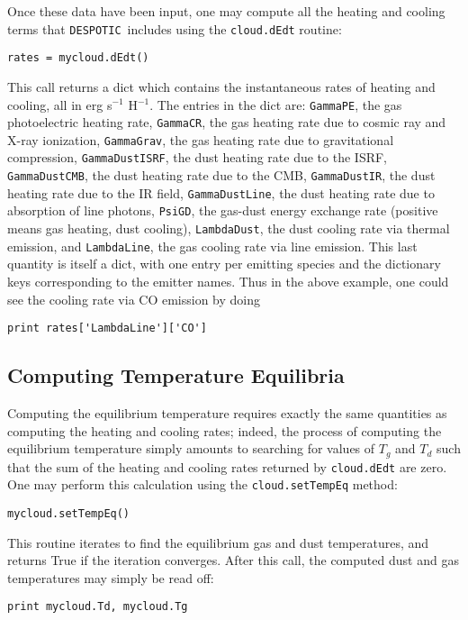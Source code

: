 \documentclass[12pt]{article}
\newcommand{\despotic}{\texttt{DESPOTIC}}
\begin{document}
Once these data have been input, one may compute all the heating and cooling terms that \despotic\ includes using the \verb=cloud.dEdt= routine:
\begin{verbatim}
rates = mycloud.dEdt()
\end{verbatim}
This call returns a dict which contains the instantaneous rates of heating and cooling, all in erg s$^{-1}$ H$^{-1}$. The entries in the dict are: \verb=GammaPE=, the gas photoelectric heating rate, \verb=GammaCR=, the gas heating rate due to cosmic ray and X-ray ionization, \verb=GammaGrav=, the gas heating rate due to gravitational compression, \verb=GammaDustISRF=, the dust heating rate due to the ISRF, \verb=GammaDustCMB=, the dust heating rate due to the CMB, \verb=GammaDustIR=, the dust heating rate due to the IR field, \verb=GammaDustLine=, the dust heating rate due to absorption of line photons, \verb=PsiGD=, the gas-dust energy exchange rate (positive means gas heating, dust cooling), \verb=LambdaDust=, the dust cooling rate via thermal emission, and \verb=LambdaLine=, the gas cooling rate via line emission. This last quantity is itself a dict, with one entry per emitting species and the dictionary keys corresponding to the emitter names. Thus in the above example, one could see the cooling rate via CO emission by doing
\begin{verbatim}
print rates['LambdaLine']['CO']
\end{verbatim}


\subsection{Computing Temperature Equilibria}

Computing the equilibrium temperature requires exactly the same quantities as computing the heating and cooling rates; indeed, the process of computing the equilibrium temperature simply amounts to searching for values of $T_g$ and $T_d$ such that the sum of the heating and cooling rates returned by \verb=cloud.dEdt= are zero. One may perform this calculation using the \verb=cloud.setTempEq= method:
\begin{verbatim}
mycloud.setTempEq()
\end{verbatim}
This routine iterates to find the equilibrium gas and dust temperatures, and returns True if the iteration converges. After this call, the computed dust and gas temperatures may simply be read off:
\begin{verbatim}
print mycloud.Td, mycloud.Tg
\end{verbatim}
\end{document}
